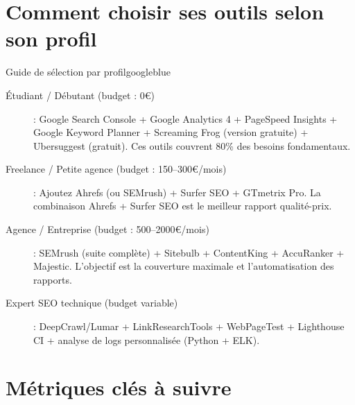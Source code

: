\documentclass[12pt,a4paper,twoside]{report}
\begin{document}
\section*{Comment choisir ses outils selon son profil}

\begin{mybox}{Guide de sélection par profil}{googleblue}
\begin{description}
    \item[Étudiant / Débutant (budget : 0€)] : Google Search Console + Google Analytics 4 + PageSpeed Insights + Google Keyword Planner + Screaming Frog (version gratuite) + Ubersuggest (gratuit). Ces outils couvrent 80\% des besoins fondamentaux.
    \item[Freelance / Petite agence (budget : 150--300€/mois)] : Ajoutez Ahrefs (ou SEMrush) + Surfer SEO + GTmetrix Pro. La combinaison Ahrefs + Surfer SEO est le meilleur rapport qualité-prix.
    \item[Agence / Entreprise (budget : 500--2000€/mois)] : SEMrush (suite complète) + Sitebulb + ContentKing + AccuRanker + Majestic. L'objectif est la couverture maximale et l'automatisation des rapports.
    \item[Expert SEO technique (budget variable)] : DeepCrawl/Lumar + LinkResearchTools + WebPageTest + Lighthouse CI + analyse de logs personnalisée (Python + ELK).
\end{description}
\end{mybox}

\section*{Métriques clés à suivre}
\end{document}
